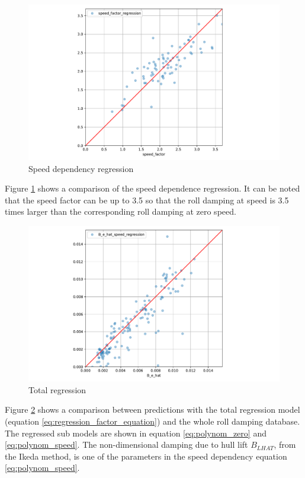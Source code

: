 \begin{figure}[H]
    \centering
    \includegraphics[width=\columnwidth]{figures/B_e_factor_regression.pdf}
    \caption{Speed dependency regression}
    \label{fig:B_e_factor_regression}
\end{figure}
Figure \ref{fig:B_e_factor_regression} shows a comparison of the speed dependence regression. It can be noted that the speed factor can be up to 3.5 so that the roll damping at speed is 3.5 times larger than the corresponding roll damping at zero speed.

\begin{figure}[H]
    \centering
    \includegraphics[width=\columnwidth]{figures/B_e_factor_regression_total.pdf}
    \caption{Total regression}
    \label{fig:B_e_factor_regression_total}
\end{figure}
Figure \ref{fig:B_e_factor_regression_total} shows a comparison between predictions with the total regression model (equation 
\ref{eq:regression_factor_equation}) and the whole roll damping database. The regressed sub models are shown in equation \ref{eq:polynom_zero} and \ref{eq:polynom_speed}. The non-dimensional damping due to hull lift $B_{LHAT}$, from the Ikeda method, is one of the parameters in the speed dependency equation \ref{eq:polynom_speed}.


